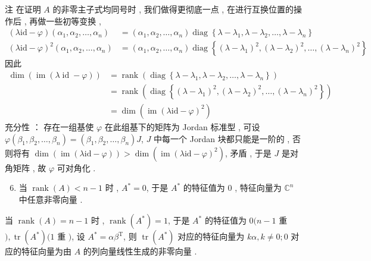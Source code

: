 \documentclass[10pt]{article}
\begin{document}
 注   在证明  $A$  的非零主子式均同号时 ,  我们做得更彻底一点 ,  在进行互换位置的操作后 ,  再做一些初等变换 ,
$$
\begin{aligned}
(\lambda \mathrm{id}-\varphi)\left(\alpha_{1}, \alpha_{2}, \ldots, \alpha_{n}\right) &=\left(\alpha_{1}, \alpha_{2}, \ldots, \alpha_{n}\right) \operatorname{diag}\left\{\lambda-\lambda_{1}, \lambda-\lambda_{2}, \ldots, \lambda-\lambda_{n}\right\} \\
(\lambda \mathrm{id}-\varphi)^{2}\left(\alpha_{1}, \alpha_{2}, \ldots, \alpha_{n}\right) &=\left(\alpha_{1}, \alpha_{2}, \ldots, \alpha_{n}\right) \operatorname{diag}\left\{\left(\lambda-\lambda_{1}\right)^{2},\left(\lambda-\lambda_{2}\right)^{2}, \ldots,\left(\lambda-\lambda_{n}\right)^{2}\right\}
\end{aligned}
$$
 因此 
$$
\begin{aligned}
\operatorname{dim}(\operatorname{im}(\lambda \operatorname{id}-\varphi)) &=\operatorname{rank}\left(\operatorname{diag}\left\{\lambda-\lambda_{1}, \lambda-\lambda_{2}, \ldots, \lambda-\lambda_{n}\right\}\right) \\
&=\operatorname{rank}\left(\operatorname{diag}\left\{\left(\lambda-\lambda_{1}\right)^{2},\left(\lambda-\lambda_{2}\right)^{2}, \ldots,\left(\lambda-\lambda_{n}\right)^{2}\right\}\right) \\
&=\operatorname{dim}\left(\operatorname{im}(\lambda \mathrm{id}-\varphi)^{2}\right)
\end{aligned}
$$
 充分性 ： 存在一组基使  $\varphi$  在此组基下的矩阵为  Jordan  标准型 ,  可设  $\varphi\left(\beta_{1}, \beta_{2}, \ldots, \beta_{n}\right)=\left(\beta_{1}, \beta_{2}, \ldots, \beta_{n}\right) J$, $J$  中每一个  Jordan  块都只能是一阶的 ,  否则将有  $\operatorname{dim}(\operatorname{im}(\lambda \mathrm{id}-\varphi))>\operatorname{dim}\left(\operatorname{im}(\lambda \mathrm{id}-\varphi)^{2}\right)$,  矛盾 ,  于是  $J$  是对角矩阵 ,  故  $\varphi$  可对角化 .

\begin{enumerate}
  \setcounter{enumi}{5}
  \item  当  $\operatorname{rank}(A)<n-1$  时 , $A^{*}=0$,  于是  $A^{*}$  的特征值为  0 ,  特征向量为  $\mathbb{C}^{n}$  中任意非零向量 .
\end{enumerate}
 当  $\operatorname{rank}(A)=n-1$  时 , $\operatorname{rank}\left(A^{*}\right)=1$,  于是  $A^{*}$  的特征值为  $0(n-1$  重  $), \operatorname{tr}\left(A^{*}\right)(1$  重  $)$,  设  $A^{*}=\alpha \beta^{\mathrm{T}}$,  则  $\operatorname{tr}\left(A^{*}\right)$  对应的特征向量为  $k \alpha, k \neq 0 ; 0$  对应的特征向量为由  $A$  的列向量线性生成的非零向量 .
\end{document}
